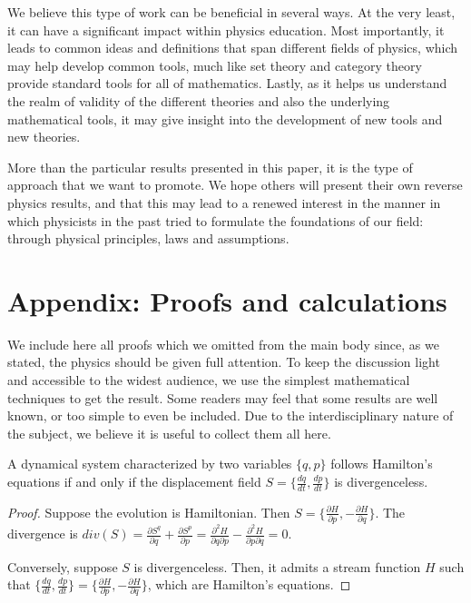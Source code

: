 \documentclass[10pt,twocolumn, nofootinbib]{revtex4-2}
\begin{document}
We believe this type of work can be beneficial in several ways. At the very least, it can have a significant impact within physics education. Most importantly, it leads to common ideas and definitions that span different fields of physics, which may help develop common tools, much like set theory and category theory provide standard tools for all of mathematics. Lastly, as it helps us understand the realm of validity of the different theories and also the underlying mathematical tools, it may give insight into the development of new tools and new theories.

More than the particular results presented in this paper, it is the type of approach that we want to promote. We hope others will present their own reverse physics results, and that this may lead to a renewed interest in the manner in which physicists in the past tried to formulate the foundations of our field: through physical principles, laws and assumptions.

\section*{Appendix: Proofs and calculations}

We include here all proofs which we omitted from the main body since, as we stated, the physics should be given full attention. To keep the discussion light and accessible to the widest audience, we use the simplest mathematical techniques to get the result. Some readers may feel that some results are well known, or too simple to even be included. Due to the interdisciplinary nature of the subject, we believe it is useful to collect them all here.

\begin{prop}
	A dynamical system characterized by two variables $\{q, p\}$ follows Hamilton's equations if and only if the displacement field $S=\{\frac{dq}{dt}, \frac{dp}{dt} \}$ is divergenceless.
\end{prop}

\begin{proof}
	Suppose the evolution is Hamiltonian. Then $S=\{\frac{\partial H}{\partial p}, - \frac{\partial H}{\partial q} \}$. The divergence is $div(S) = \frac{\partial S^q}{\partial q} + \frac{\partial S^p}{\partial p} = \frac{\partial^2 H}{\partial q\partial p} - \frac{\partial^2H}{\partial p\partial q} = 0$.
	
	Conversely, suppose $S$ is divergenceless. Then, it admits a stream function $H$ such that $\{\frac{dq}{dt}, \frac{dp}{dt}\} = \{\frac{\partial H}{\partial p}, - \frac{\partial H}{\partial q} \}$, which are Hamilton's equations.
\end{proof}
\end{document}
